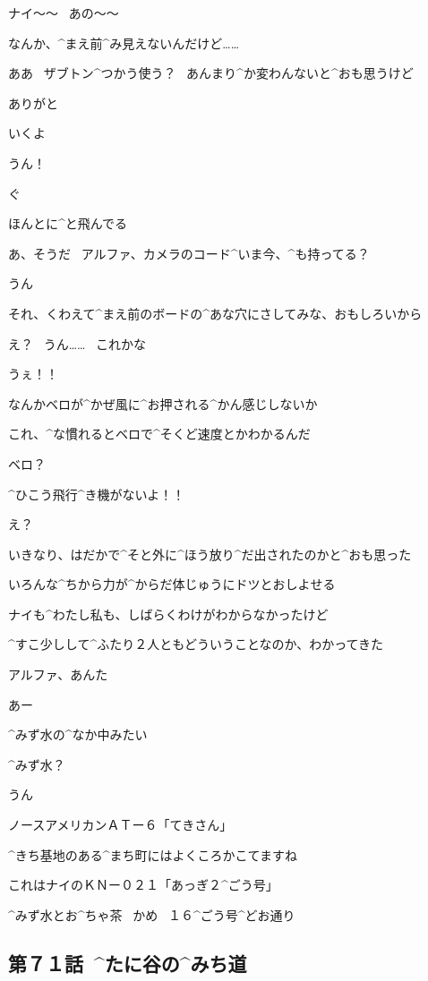 \page
\A ナイ〜〜
\ あの〜〜

\A なんか、^{まえ}{前}^{み}{見}えないんだけど……

\NA ああ
\ ザブトン^{つかう}{使う}？
\ あんまり^{か}{変}わんないと^{おも}{思}うけど

\A ありがと

\page
\NA いくよ

\A うん！

\page
\A ぐ

\page[68]
\A ほんとに^{と}{飛}んでる

\page
\NA あ、そうだ
\ アルファ、カメラのコード^{いま}{今}、^{も}{持}ってる？

\A うん

\NA それ、くわえて^{まえ}{前}のボードの^{あな}{穴}にさしてみな、おもしろいから

\A え？
\ うん……
\ これかな

\A うぇ！！

\NA なんかベロが^{かぜ}{風}に^{お}{押}される^{かん}{感}じしないか

\NA これ、^{な}{慣}れるとベロで^{そくど}{速度}とかわかるんだ

\A ベロ？

\page[71]
\A ^{ひこう}{飛行}^{き}{機}がないよ！！

\NA え？

\page
\A いきなり、はだかで^{そと}{外}に^{ほう}{放}り^{だ}{出}されたのかと^{おも}{思}った

\A いろんな^{ちから}{力}が^{からだ}{体}じゅうにドツとおしよせる

\A ナイも^{わたし}{私}も、しばらくわけがわからなかったけど

\A ^{すこ}{少}しして^{ふたり}{２人}ともどういうことなのか、わかってきた

\page
\NA アルファ、あんた

\page
\A あー

\A ^{みず}{水}の^{なか}{中}みたい

\NA ^{みず}{水}？

\A うん

\page
\Sign ノースアメリカンＡＴー６「てきさん」

\Sign ^{きち}{基地}のある^{まち}{町}にはよくころかこてますね

\Sign これはナイのＫＮー０２１「あっぎ２^{ごう}{号}」

\page
\Sign ^{みず}{水}とお^{ちゃ}{茶}
\ かめ
\ １６^{ごう}{号}^{どお}{通}り


\subsection{第７１話\ ^{たに}{谷}の^{みち}{道}}

